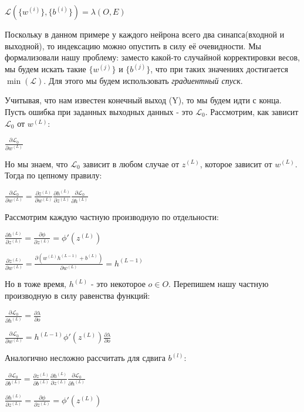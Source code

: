 \documentclass[12pt]{extarticle}
\begin{document}
	\centerline{$\mathcal{L}(\{w^{(i)}\}, \{b^{(i)}\}) = \lambda(O, E)$}
	Поскольку в данном примере у каждого нейрона всего два синапса(входной и выходной), то индексацию можно опустить в силу её очевидности.
	Мы формализовали нашу проблему: заместо какой-то случайной корректировки весов, мы будем искать такие $\{w^{(j)}\}$ и $\{b^{(j)}\}$, что при таких значениях достигается $\min(\mathcal{L})$. Для этого мы будем использовать \textit{градиентный спуск}.
	
	Учитывая, что нам известен конечный выход (Y), то мы будем идти с конца. Пусть ошибка при заданных выходных данных - это $\mathcal{L}_0$.
	Рассмотрим, как зависит $\mathcal{L}_0$ от $w^{(L)}$:
	
	\centerline{$\frac{\partial \mathcal{L}_0}{\partial w^{(L)}}$}
	
	Но мы знаем, что $\mathcal{L}_0$ зависит в любом случае от $z^{(L)}$, которое зависит от $w^{(L)}$. Тогда по цепному правилу:
	
	\centerline{$\frac{\partial \mathcal{L}_0}{\partial w^{(L)}} = \frac{\partial z^{(L)}}{\partial w^{(L)}}\frac{\partial h^{(L)}}{\partial z^{(L)}}\frac{\partial \mathcal{L}_0 }{\partial h^{(L)}}$}
	
	Рассмотрим каждую частную производную по отдельности:
	
	\centerline{$\frac{\partial h^{(L)}}{\partial z^{(L)}} = \frac{\partial \phi}{\partial z^{(L)}} = \phi'(z^{(L)})$}
	
	\centerline{$\frac{\partial z^{(L)}}{\partial w^{(L)}} = \frac{\partial (w^{(L)}h^{(L-1)}+b^{(L)})}{\partial w^{(L)}} = h^{(L-1)}$}
	
	Но в тоже время, $h^{(L)}$ - это некоторое $o \in O$. Перепишем нашу частную производную в силу равенства функций:
	
	\centerline{$\frac{\partial \mathcal{L}_0 }{\partial h^{(L)}} = \frac{\partial \lambda}{\partial o}$}
	
	\centerline{$\frac{\partial \mathcal{L}_0}{\partial w^{(L)}} = h^{(L-1)}\phi'(z^{(L)})\frac{\partial \lambda}{\partial o}$}
	
	Аналогично несложно рассчитать для сдвига $b^{(l)}$:
	
	\centerline{$\frac{\partial \mathcal{L}_0}{\partial b^{(L)}} = \frac{\partial z^{(L)}}{\partial b^{(L)}}\frac{\partial h^{(L)}}{\partial z^{(L)}}\frac{\partial \mathcal{L}_0 }{\partial h^{(L)}}$}
	
	\centerline{$\frac{\partial h^{(L)}}{\partial z^{(L)}} = \frac{\partial \phi}{\partial z^{(L)}} = \phi'(z^{(L)})$}
	
\end{document}

